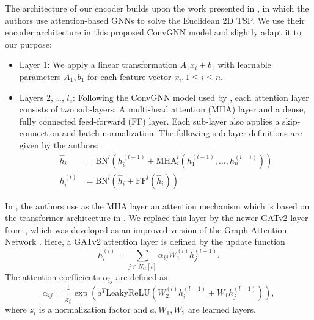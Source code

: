 \documentclass[draft,final]{vutinfth} %
\begin{document}


The architecture of our encoder builds upon the work presented in \cite{Kool2019}, in which the authors use attention-based GNNs to solve the Euclidean 2D TSP. We use their encoder architecture in this proposed ConvGNN model and slightly adapt it to our purpose:
\begin{itemize}
    \item Layer 1: We apply a linear transformation $A_1 x_i + b_1$ with learnable parameters $A_1, b_1$ for each feature vector $x_i, 1 \leq i \leq n$.
    \item Layers 2, \dots, $l_e$: Following the ConvGNN model used by \cite{Kool2019}, each attention layer consists of two sub-layers: A multi-head attention (MHA) layer and a dense, fully connected feed-forward (FF) layer. Each sub-layer also applies a skip-connection and batch-normalization. The following sub-layer definitions are given by the authors: 
    \begin{align*}
        \hat{h}_i &= \text{BN}^l(h_i^{(l-1)} + \mathrm{MHA}_i^l (h_1^{(l-1)}, \dots , h_n^{(l-1)}) ) \\
        h_i^{(l)} &= \text{BN}^l(\hat{h}_i + \mathrm{FF}^l(\hat{h}_i))
    \end{align*}
\end{itemize}
In \cite{Kool2019}, the authors use as the MHA layer an attention mechanism which is based on the transformer architecture in \cite{VaswaniSPUJGKP17}. We replace this layer by the newer GATv2 layer from \cite{Brody2021}, which was developed as an improved version of the Graph Attention Network \cite{Velickovic2018}. Here, a GATv2 attention layer is defined by the update function 
\[
    h_i^{(l)} = \sum_{j \in N_G[i]} \alpha_{ij} W_{1}^{(l)} h_j^{(l-1)}.    
\]
The attention coefficients $\alpha_{ij}$ are defined as 
\[
    \alpha_{ij} = \frac{1}{z_i} \exp(a^T \mathrm{LeakyReLU}(W_2^{(l)}h_i^{(l-1)} + W_1 h_j^{(l-1)} )),    
\]
where $z_i$ is a normalization factor and $a, W_1, W_2$ are learned layers. 
\end{document}
